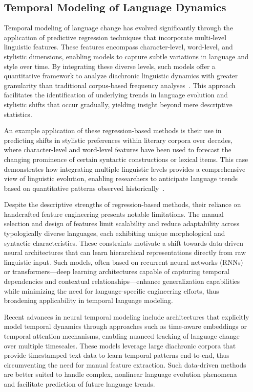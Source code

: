\documentclass[sigconf]{acmart}
\begin{document}
\subsection{Temporal Modeling of Language Dynamics}

Temporal modeling of language change has evolved significantly through the application of predictive regression techniques that incorporate multi-level linguistic features. These features encompass character-level, word-level, and stylistic dimensions, enabling models to capture subtle variations in language and style over time. By integrating these diverse levels, such models offer a quantitative framework to analyze diachronic linguistic dynamics with greater granularity than traditional corpus-based frequency analyses~\cite{ref41}. This approach facilitates the identification of underlying trends in language evolution and stylistic shifts that occur gradually, yielding insight beyond mere descriptive statistics.

An example application of these regression-based methods is their use in predicting shifts in stylistic preferences within literary corpora over decades, where character-level and word-level features have been used to forecast the changing prominence of certain syntactic constructions or lexical items. This case demonstrates how integrating multiple linguistic levels provides a comprehensive view of linguistic evolution, enabling researchers to anticipate language trends based on quantitative patterns observed historically~\cite{ref41}.

Despite the descriptive strengths of regression-based methods, their reliance on handcrafted feature engineering presents notable limitations. The manual selection and design of features limit scalability and reduce adaptability across typologically diverse languages, each exhibiting unique morphological and syntactic characteristics. These constraints motivate a shift towards data-driven neural architectures that can learn hierarchical representations directly from raw linguistic input. Such models, often based on recurrent neural networks (RNNs) or transformers—deep learning architectures capable of capturing temporal dependencies and contextual relationships—enhance generalization capabilities while minimizing the need for language-specific engineering efforts, thus broadening applicability in temporal language modeling.

Recent advances in neural temporal modeling include architectures that explicitly model temporal dynamics through approaches such as time-aware embeddings or temporal attention mechanisms, enabling nuanced tracking of language change over multiple timescales. These models leverage large diachronic corpora that provide timestamped text data to learn temporal patterns end-to-end, thus circumventing the need for manual feature extraction. Such data-driven methods are better suited to handle complex, nonlinear language evolution phenomena and facilitate prediction of future language trends.
\end{document}
